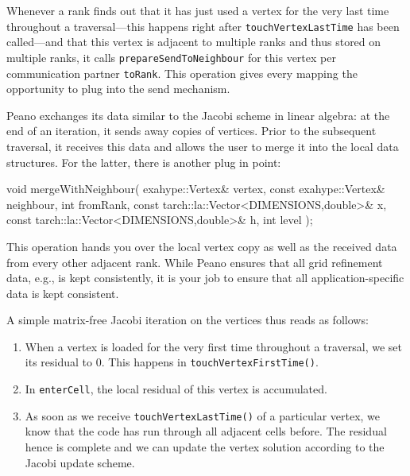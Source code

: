 \noindent
Whenever a rank finds out that it has just used a vertex for the very last time
throughout a traversal---this happens right after \texttt{touchVertexLastTime}
has been called---and that this vertex is adjacent to multiple ranks and thus
stored on multiple ranks, it calls \texttt{prepareSendToNeighbour} for this
vertex per communication partner \texttt{toRank}.
This operation gives every mapping the opportunity to plug into the send
mechanism.

Peano exchanges its data similar to the Jacobi scheme in linear algebra: 
at the end of an iteration, it sends away copies of vertices. 
Prior to the subsequent traversal, it receives this data and allows the user to
merge it into the local data structures.
For the latter, there is another plug in point:
\begin{code}
void mergeWithNeighbour(
  exahype::Vertex&                              vertex,
  const exahype::Vertex&                        neighbour,
  int                                           fromRank,
  const tarch::la::Vector<DIMENSIONS,double>&   x,
  const tarch::la::Vector<DIMENSIONS,double>&   h,
  int                                           level
);
\end{code}

\noindent
This operation hands you over the local vertex copy as well as the received data
from every other adjacent rank.
While Peano ensures that all grid refinement data, e.g., is kept consistently,
it is your job to ensure that all application-specific data is kept consistent.

A simple matrix-free Jacobi iteration on the vertices thus reads as follows:
\begin{enumerate}
  \item When a vertex is loaded for the very first time throughout a traversal,
  we set its residual to $0$. This happens in \texttt{touchVertexFirstTime()}.
  \item In \texttt{enterCell}, the local residual of this vertex is accumulated.
  \item As soon as we receive \texttt{touchVertexLastTime()} of a particular
  vertex, we know that the code has run through all adjacent cells before. The
  residual hence is complete and we can update the vertex solution according to
  the Jacobi update scheme.
\end{enumerate}


